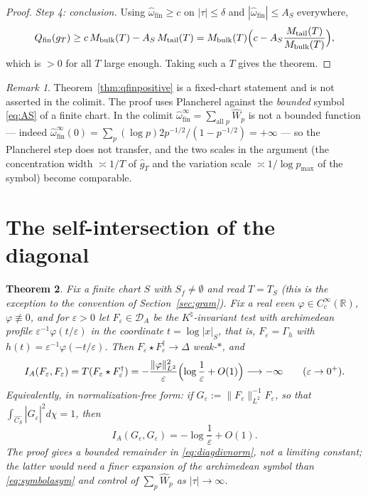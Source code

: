 \documentclass[11pt]{amsart}
\newtheorem{theorem}{Theorem}[section]
\theoremstyle{definition}
\theoremstyle{remark}
\newtheorem{remark}[theorem]{Remark}
\newcommand{\R}{\mathbb R}
\newcommand{\Knat}{K^{\natural}}
\newcommand{\DA}{\mathcal D_A}
\begin{document}
\begin{proof}
\emph{Step 4: conclusion.} Using $\widehat\omega_{\mathrm{fin}}\ge c$ on
$|\tau|\le\delta$ and $|\widehat\omega_{\mathrm{fin}}|\le A_S$ everywhere,
\[
  Q_{\mathrm{fin}}(g_T)\ge c\,M_{\mathrm{bulk}}(T)-A_S\,M_{\mathrm{tail}}(T)
   =M_{\mathrm{bulk}}(T)\Bigl(c-A_S\frac{M_{\mathrm{tail}}(T)}
     {M_{\mathrm{bulk}}(T)}\Bigr),
\]
which is $>0$ for all $T$ large enough. Taking such a $T$ gives the theorem.
\end{proof}

\begin{remark}\label{rem:qfinscope}
Theorem~\ref{thm:qfinpositive} is a fixed-chart statement and is not asserted
in the colimit. The proof uses Plancherel against the \emph{bounded} symbol
\eqref{eq:AS} of a finite chart. In the colimit
$\widehat\omega_{\mathrm{fin}}^\infty=\sum_{\text{all }p}\widehat W_p$ is not a
bounded function --- indeed
$\widehat\omega_{\mathrm{fin}}^\infty(0)=\sum_p(\log p)2p^{-1/2}/(1-p^{-1/2})
=+\infty$ --- so the Plancherel step does not transfer, and the two scales in
the argument (the concentration width $\asymp1/T$ of $\widehat g_T$ and the
variation scale $\asymp1/\log p_{\max}$ of the symbol) become comparable.
\end{remark}

\section{The self-intersection of the diagonal}\label{sec:diagonal}

\begin{theorem}\label{thm:infgenus}
Fix a finite chart $S$ with $S_f\ne\emptyset$ and read $T=T_S$ (this is the
exception to the convention of Section~\ref{sec:gram}). Fix a real even $\varphi\in C_c^\infty(\R)$,
$\varphi\not\equiv0$, and for $\varepsilon>0$ let $F_\varepsilon\in\DA$ be the
$\Knat$-invariant test with archimedean profile
$\varepsilon^{-1}\varphi(t/\varepsilon)$ in the coordinate $t=\log|x|_S$, that
is, $F_\varepsilon=\Gamma_h$ with $h(t)=\varepsilon^{-1}\varphi(-t/\varepsilon)$.
Then $F_\varepsilon\star F_\varepsilon^\dagger\to\Delta$ weak-$*$, and
\begin{equation}\label{eq:diagdiv}
  I_A(F_\varepsilon,F_\varepsilon)=T(F_\varepsilon\star F_\varepsilon^\dagger)
   =-\frac{\|\varphi\|_{L^2}^2}{\varepsilon}
     \Bigl(\log\frac1\varepsilon+O(1)\Bigr)\longrightarrow-\infty
   \qquad(\varepsilon\to0^+).
\end{equation}
Equivalently, in normalization-free form: if
$G_\varepsilon:=\|F_\varepsilon\|_{L^2}^{-1}F_\varepsilon$, so that
$\int_{\widehat{C_S}}|\widehat G_\varepsilon|^2d\chi=1$, then
\begin{equation}\label{eq:diagdivnorm}
  I_A(G_\varepsilon,G_\varepsilon)=-\log\frac1\varepsilon+O(1).
\end{equation}
The proof gives a bounded remainder in \eqref{eq:diagdivnorm}, not a limiting
constant; the latter would need a finer expansion of the archimedean symbol
than \eqref{eq:symbolasym} and control of $\sum_p\widehat W_p$ as
$|\tau|\to\infty$.
\end{theorem}
\end{document}
